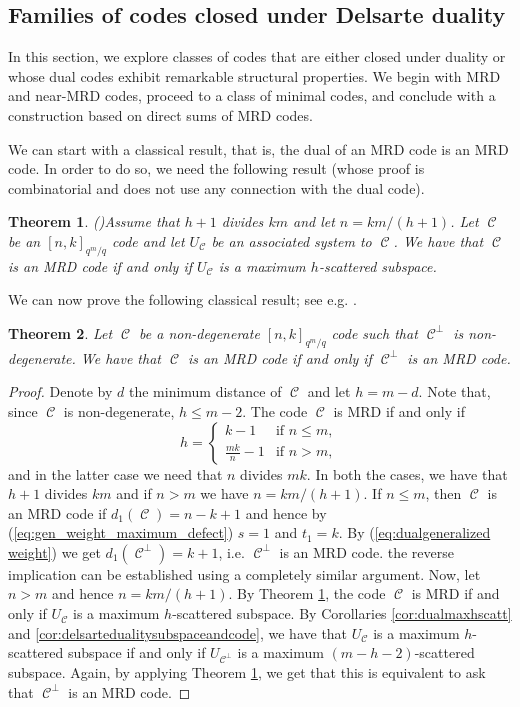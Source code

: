 \documentclass[11pt]{amsart}
\DeclareMathOperator{\C}{\mathcal{C}}
\newtheorem{theorem}{Theorem}[section]
\begin{document}
\subsection{Families of codes closed under Delsarte duality}

In this section, we explore classes of codes that are either closed under duality or whose dual codes exhibit remarkable structural properties. We begin with MRD and near-MRD codes, proceed to a class of minimal codes, and conclude with a construction based on direct sums of MRD codes.

We can start with a classical result, that is,  the dual of an MRD code is an MRD code. In order to do so, we need the following result (whose proof is combinatorial and does not use any connection with the dual code). 

\begin{theorem}(\cite[Theorem 3.2]{zini2021scattered})\label{thm:MRDmaxhscatt}
    Assume that $h+1$ divides $km$ and let $n=km/(h+1)$.
    Let $\C$ be an $[n,k]_{q^m/q}$ code and let $U_{\C}$ be an associated system to $\C$.
    We have that $\C$ is an MRD code if and only if $U_{\C}$ is a maximum $h$-scattered subspace.
\end{theorem}

We can now prove the following classical result; see e.g. \cite{ga85a,de78}.

\begin{theorem}
    Let $\C$ be a non-degenerate $[n,k]_{q^m/q}$ code such that $\C^{\perp}$ is non-degenerate. 
    We have that $\C$ is an MRD code if and only if $\C^\perp$ is an MRD code.
\end{theorem}
\begin{proof}
    Denote by $d$ the minimum distance of $\C$ and let $h=m-d$. Note that, since $\C$ is non-degenerate, $h\leq m-2$.
    The code $\C$ is MRD if and only if
    \[
    h=\begin{cases}
        k-1 & \text{if } n\leq m,\\
        \frac{mk}n-1 & \text{if } n> m,
    \end{cases}
    \]
    and in the latter case we need that $n$ divides $mk$.
    In both the cases, we have that $h+1$ divides $km$ and if $n>m$ we have $n=km/(h+1)$.
    If $n\leq m$, then $\C$ is an MRD code if $d_1(\C)=n-k+1$ and hence by (\ref{eq:gen_weight_maximum_defect}) $s=1$ and $t_1=k$. By (\ref{eq:dualgeneralized weight}) we get $d_1(\C^\perp)=k+1$, i.e. $\C^\perp $ is an MRD code. the reverse implication can be established using a completely similar argument. Now, let $n>m$ and hence $n=km/(h+1)$.  By Theorem \ref{thm:MRDmaxhscatt}, the code $\C$ is MRD if and only if $U_{\C}$ is a maximum $h$-scattered subspace.
    By Corollaries \ref{cor:dualmaxhscatt} and \ref{cor:delsartedualitysubspaceandcode}, we have that $U_{\C}$ is a maximum $h$-scattered subspace if and only if $U_{\C^\perp}$ is a maximum $(m-h-2)$-scattered subspace.
    Again, by applying Theorem \ref{thm:MRDmaxhscatt}, we get that this is equivalent to ask that $\C^\perp$ is an MRD code.
\end{proof}
\end{document}
